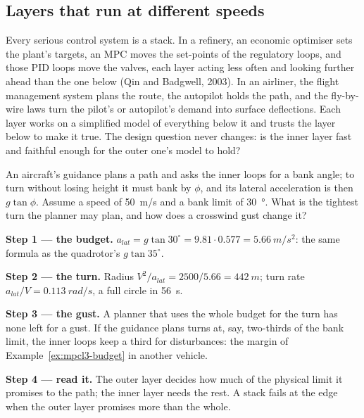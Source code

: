 \subsection{Layers that run at different speeds}
Every serious control system is a stack. In a refinery, an economic optimiser sets the plant's targets, an MPC moves the set-points of the regulatory loops, and those PID loops move the valves, each layer acting less often and looking further ahead than the one below (Qin and Badgwell, 2003). In an airliner, the flight management system plans the route, the autopilot holds the path, and the fly-by-wire laws turn the pilot's or autopilot's demand into surface deflections. Each layer works on a simplified model of everything below it and trusts the layer below to make it true. The design question never changes: is the inner layer fast and faithful enough for the outer one's model to hold?

\begin{example}
\label{ex:mpcl3-aircraft}
An aircraft's guidance plans a path and asks the inner loops for a bank angle; to turn without losing height it must bank by $\phi$, and its lateral acceleration is then $g\tan\phi$. Assume a speed of \SI{50}{m/s} and a bank limit of \SI{30}{\degree}. What is the tightest turn the planner may plan, and how does a crosswind gust change it?

\textbf{Step 1 — the budget.} $a_{lat} = g\tan 30^\circ = 9.81 \cdot 0.577 = \SI{5.66}{m/s^2}$: the same formula as the quadrotor's $g\tan 35^\circ$.

\textbf{Step 2 — the turn.} Radius $V^2/a_{lat} = 2500/5.66 = \SI{442}{m}$; turn rate $a_{lat}/V = \SI{0.113}{rad/s}$, a full circle in \SI{56}{s}.

\textbf{Step 3 — the gust.} A planner that uses the whole budget for the turn has none left for a gust. If the guidance plans turns at, say, two-thirds of the bank limit, the inner loops keep a third for disturbances: the margin of Example~\ref{ex:mpcl3-budget} in another vehicle.

\textbf{Step 4 — read it.} The outer layer decides how much of the physical limit it promises to the path; the inner layer needs the rest. A stack fails at the edge when the outer layer promises more than the whole.
\end{example}

